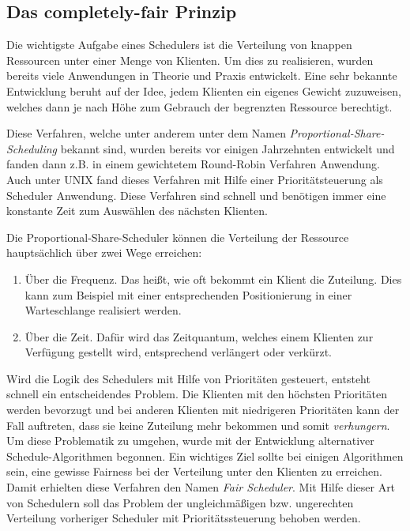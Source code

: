 \subsection{Das completely-fair Prinzip}\label{s:fair}
Die wichtigste Aufgabe eines Schedulers ist die Verteilung von knappen Ressourcen unter einer Menge von Klienten. 
Um dies zu realisieren, wurden bereits viele Anwendungen in Theorie und Praxis entwickelt.
Eine sehr bekannte Entwicklung beruht auf der Idee, jedem Klienten ein eigenes Gewicht zuzuweisen, welches dann je nach Höhe zum Gebrauch der begrenzten Ressource berechtigt.

Diese Verfahren, welche unter anderem unter dem Namen \textit{Proportional-Share-Scheduling} bekannt sind, wurden bereits vor einigen Jahrzehnten entwickelt und fanden dann z.B. in einem gewichtetem Round-Robin Verfahren Anwendung. Auch unter UNIX fand dieses Verfahren  mit Hilfe einer Prioritätsteuer\-ung als Scheduler Anwendung. Diese Verfahren sind schnell und benötigen immer eine konstante Zeit zum Auswählen des nächsten Klienten. 

Die Proportional-Share-Scheduler können die Verteilung der Ressource hauptsächlich über zwei Wege erreichen:
\begin{enumerate}
	\item Über die Frequenz. Das heißt, wie oft bekommt ein Klient die Zuteilung. Dies kann zum Beispiel mit einer entsprechenden Positionierung in einer Warteschlange realisiert werden.
	\item Über die Zeit. Dafür wird das Zeitquantum, welches einem Klienten zur Verfügung gestellt wird, entsprechend verlängert oder verkürzt.
\end{enumerate}

Wird die Logik des Schedulers mit Hilfe von Prioritäten gesteuert, entsteht schnell ein entscheidendes Problem. Die Klienten mit den höchsten Prioritäten werden bevorzugt und bei anderen Klienten mit niedrigeren Prioritäten kann der Fall auftreten, dass sie keine Zuteilung mehr bekommen und somit \textit{verhungern}.
Um diese Problematik zu umgehen, wurde mit der Entwicklung alternativer Schedule-Algorithmen begonnen. Ein wichtiges Ziel sollte bei einigen Algorithmen sein, eine gewisse Fairness bei der Verteilung unter den Klienten zu erreichen. Damit erhielten diese Verfahren den Namen \textit{Fair Scheduler}. Mit Hilfe dieser Art von Schedulern soll das Problem der ungleich\-mäßigen bzw. ungerechten Verteilung vorheriger Scheduler mit Prioritäts\-steuer\-ung  behoben werden.

